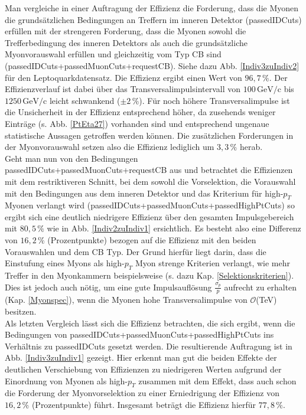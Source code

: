 Man vergleiche in einer Auftragung der Effizienz die Forderung, dass die Myonen die grundsätzlichen Bedingungen an Treffern im inneren Detektor (passedIDCuts) erfüllen mit der strengeren Forderung, dass die Myonen sowohl die Trefferbedingung des inneren Detektors als auch die grundsätzliche Myonvorauswahl erfüllen und gleichzeitig vom Typ CB sind (passedIDCuts+passedMuonCuts+requestCB). Siehe dazu Abb. \ref{Indiv3zuIndiv2} für den Leptoquarkdatensatz. Die Effizienz ergibt einen Wert von $96,7\,\%$. Der Effizienzverlauf ist dabei über das Transversalimpulsintervall von $100\,\text{GeV}/\text{c}$ bis $1250\,\text{GeV}/\text{c}$ leicht schwankend ($\pm2\,\%$). Für noch höhere Transversalimpulse ist die Unsicherheit in der Effizienz entsprechend höher, da zusehends weniger Einträge (s. Abb. \ref{PtEta27}) vorhanden sind und entsprechend ungenaue statistische Aussagen getroffen werden können. Die zusätzlichen Forderungen in der Myonvorauswahl setzen also die Effizienz lediglich um $3,3\,\%$ herab.\\ 
Geht man nun von den Bedingungen passedIDCuts+passedMuonCuts+requestCB aus und betrachtet die Effizienzen mit dem restriktiveren Schnitt, bei dem sowohl die Vorselektion, die Vorauswahl mit den Bedingungen aus dem inneren Detektor und das Kriterium für high-$p_T$ Myonen verlangt wird (passedIDCuts\-+passedMuonCuts\-+passedHighPtCuts) so ergibt sich eine deutlich niedrigere Effizienz über den gesam\-ten Impulsgebereich mit $80,5\,\%$ wie in Abb. \ref{Indiv2zuIndiv1} ersichtlich. Es besteht also eine Differenz von $16,2\,\%$ (Prozentpunkte) bezogen auf die Effizienz mit den beiden Vorauswahlen und dem CB Typ. Der Grund hierfür liegt darin, dass die Einstufung eines Myons als high-$p_T$ Myon strenge Kriterien verlangt, wie mehr Treffer in den Myonkammern beispielsweise (s. dazu Kap. \ref{Selektionskriterien}). Dies ist jedoch auch nötig, um eine gute Impulsauflösung $\frac{\sigma_p}{p}$ aufrecht zu erhalten (Kap. \ref{Myonspec}), wenn die Myonen hohe Transversalimpulse von $\mathcal{O}$(TeV) besitzen.\\
Als letzten Vergleich lässt sich die Effizienz betrachten, die sich ergibt, wenn die Bedingungen von passedIDCuts+passedMuonCuts+passedHighPtCuts ins Verhältnis zu passedIDCuts gesetzt werden. Die resultierende Auftragung ist in Abb. \ref{Indiv3zuIndiv1} gezeigt. Hier erkennt man gut die beiden Effekte der deutlichen Verschiebung von Effizienzen zu niedrigeren Werten aufgrund der Einordnung von Myonen als high-$p_T$ zusammen mit dem Effekt, dass auch schon die Forderung der Myonvorselektion zu einer Erniedrigung der Effizienz von $16,2\,\%$ (Prozentpunkte) führt. Insgesamt beträgt die Effizienz hierfür $77,8\,\%$.

